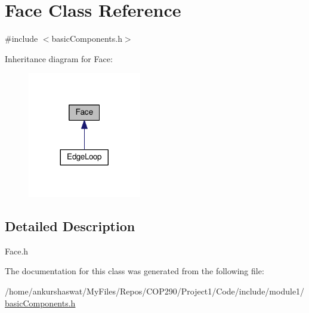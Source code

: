\hypertarget{classFace}{}\section{Face Class Reference}
\label{classFace}


{\ttfamily \#include $<$basic\+Components.\+h$>$}



Inheritance diagram for Face\+:
\nopagebreak
\begin{figure}[H]
\begin{center}
\leavevmode
\includegraphics[width=140pt]{classFace__inherit__graph}
\end{center}
\end{figure}


\subsection{Detailed Description}
Face.\+h 

The documentation for this class was generated from the following file\+:\begin{DoxyCompactItemize}
\item 
/home/ankurshaswat/\+My\+Files/\+Repos/\+C\+O\+P290/\+Project1/\+Code/include/module1/\hyperlink{basicComponents_8h}{basic\+Components.\+h}\end{DoxyCompactItemize}
